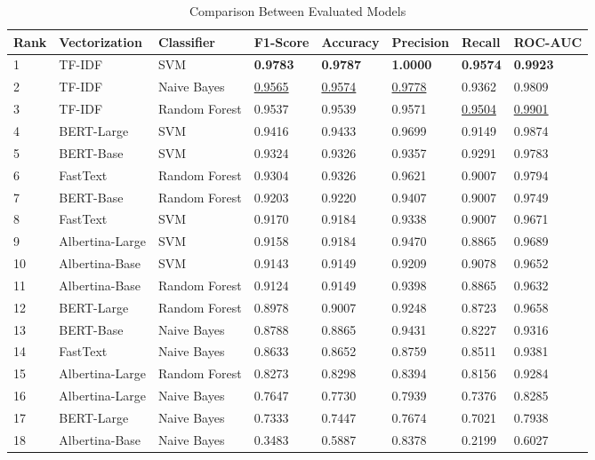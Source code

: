\documentclass[conference]{IEEEtran}
\begin{document}
\begin{table}[ht]
\caption{Comparison Between Evaluated Models}
\label{tab:comparison}
\centering
\begin{tabular}{llllllll}
\toprule
Rank & Vectorization & Classifier & F1-Score & Accuracy & Precision & Recall & ROC-AUC \\
\midrule
1 & TF-IDF & SVM & \textbf{0.9783} & \textbf{0.9787} & \textbf{1.0000} & \textbf{0.9574} & \textbf{0.9923} \\
2 & TF-IDF & Naive Bayes & \underline{0.9565} & \underline{0.9574} & \underline{0.9778} & 0.9362 & 0.9809 \\
3 & TF-IDF & Random Forest & 0.9537 & 0.9539 & 0.9571 & \underline{0.9504} & \underline{0.9901} \\
4 & BERT-Large & SVM & 0.9416 & 0.9433 & 0.9699 & 0.9149 & 0.9874 \\
5 & BERT-Base & SVM & 0.9324 & 0.9326 & 0.9357 & 0.9291 & 0.9783 \\
6 & FastText & Random Forest & 0.9304 & 0.9326 & 0.9621 & 0.9007 & 0.9794 \\
7 & BERT-Base & Random Forest & 0.9203 & 0.9220 & 0.9407 & 0.9007 & 0.9749 \\
8 & FastText & SVM & 0.9170 & 0.9184 & 0.9338 & 0.9007 & 0.9671 \\
9 & Albertina-Large & SVM & 0.9158 & 0.9184 & 0.9470 & 0.8865 & 0.9689 \\
10 & Albertina-Base & SVM & 0.9143 & 0.9149 & 0.9209 & 0.9078 & 0.9652 \\
11 & Albertina-Base & Random Forest & 0.9124 & 0.9149 & 0.9398 & 0.8865 & 0.9632 \\
12 & BERT-Large & Random Forest & 0.8978 & 0.9007 & 0.9248 & 0.8723 & 0.9658 \\
13 & BERT-Base & Naive Bayes & 0.8788 & 0.8865 & 0.9431 & 0.8227 & 0.9316 \\
14 & FastText & Naive Bayes & 0.8633 & 0.8652 & 0.8759 & 0.8511 & 0.9381 \\
15 & Albertina-Large & Random Forest & 0.8273 & 0.8298 & 0.8394 & 0.8156 & 0.9284 \\
16 & Albertina-Large & Naive Bayes & 0.7647 & 0.7730 & 0.7939 & 0.7376 & 0.8285 \\
17 & BERT-Large & Naive Bayes & 0.7333 & 0.7447 & 0.7674 & 0.7021 & 0.7938 \\
18 & Albertina-Base & Naive Bayes & 0.3483 & 0.5887 & 0.8378 & 0.2199 & 0.6027 \\
\bottomrule
\end{tabular}
\end{table}
\end{document}
